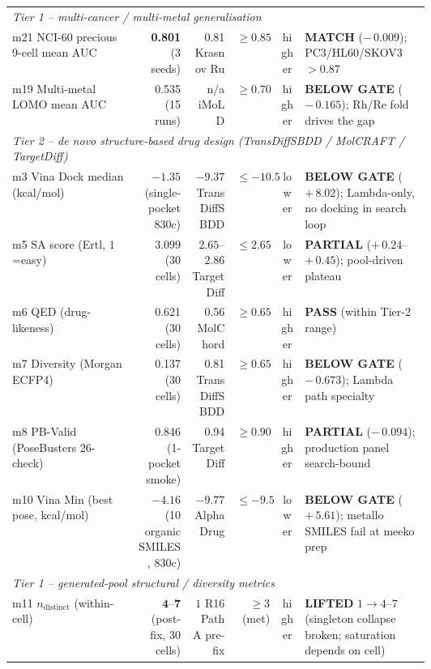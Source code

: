 \begin{table}[ht]
\begin{tabular}{p{0.30\linewidth} r r r c p{0.30\linewidth}}
\midrule
\multicolumn{6}{l}{\textit{Tier 1 -- multi-cancer / multi-metal generalisation}} \\
m21 NCI-60 precious 9-cell mean AUC    & \textbf{0.801} \MEASURED{} (3 seeds) & 0.81 Krasnov Ru \CITEDONLY{}   & $\geq 0.85$ \PROJECTED{} & higher & \textbf{MATCH} ($-\,0.009$); PC3/HL60/SKOV3 $>\!0.87$ \\
m19 Multi-metal LOMO mean AUC          & 0.535 \MEASURED{} (15 runs)        & n/a iMoLD \CITEDONLY{}          & $\geq 0.70$ \PROJECTED{} & higher & \textbf{BELOW GATE} ($-\,0.165$); Rh/Re fold drives the gap \\
\midrule
\multicolumn{6}{l}{\textit{Tier 2 -- de novo structure-based drug design (TransDiffSBDD / MolCRAFT / TargetDiff)}} \\
m3\;\; Vina Dock median (kcal/mol)     & $-1.35$ \MEASURED{} (single-pocket 830c) & $-9.37$ TransDiffSBDD \CITEDONLY{} & $\leq -10.5$ \PROJECTED{} & lower & \textbf{BELOW GATE} ($+\,8.02$); Lambda-only, no docking in search loop \\
m5\;\; SA score (Ertl, $1$=easy)       & $3.099$ \MEASURED{} (30 cells)     & $2.65$--$2.86$ TargetDiff \CITEDONLY{} & $\leq 2.65$ \PROJECTED{} & lower & \textbf{PARTIAL} ($+\,0.24$--$+\,0.45$); pool-driven plateau \\
m6\;\; QED (drug-likeness)             & 0.621 \MEASURED{} (30 cells)       & 0.56 MolChord \CITEDONLY{}      & $\geq 0.65$ \PROJECTED{} & higher & \textbf{PASS} (within Tier-2 range) \\
m7\;\; Diversity (Morgan ECFP4)        & 0.137 \MEASURED{} (30 cells)       & 0.81 TransDiffSBDD \CITEDONLY{} & $\geq 0.65$ \PROJECTED{} & higher & \textbf{BELOW GATE} ($-\,0.673$); Lambda path specialty \\
m8\;\; PB-Valid (PoseBusters 26-check) & 0.846 \MEASURED{} (1-pocket smoke) & 0.94 TargetDiff \CITEDONLY{}    & $\geq 0.90$ \PROJECTED{} & higher & \textbf{PARTIAL} ($-\,0.094$); production panel search-bound \\
m10 Vina Min (best pose, kcal/mol)    & $-4.16$ \MEASURED{} (10 organic SMILES, 830c) & $-9.77$ AlphaDrug \CITEDONLY{} & $\leq -9.5$ \PROJECTED{} & lower & \textbf{BELOW GATE} ($+\,5.61$); metallo SMILES fail at meeko prep \\
\midrule
\multicolumn{6}{l}{\textit{Tier 1 -- generated-pool structural / diversity metrics}} \\
m11 $n_{\mathrm{distinct}}$ (within-cell) & $\mathbf{4}$--$\mathbf{7}$ \MEASURED{} (post-fix, 30 cells) & $1$ R16 Path A pre-fix \MEASURED{} & $\geq 3$ (met) \PROJECTED{} & higher & \textbf{LIFTED} $1\!\to\!4$--$7$ (singleton collapse broken; saturation depends on cell) \\

\end{tabular}
\end{table}
